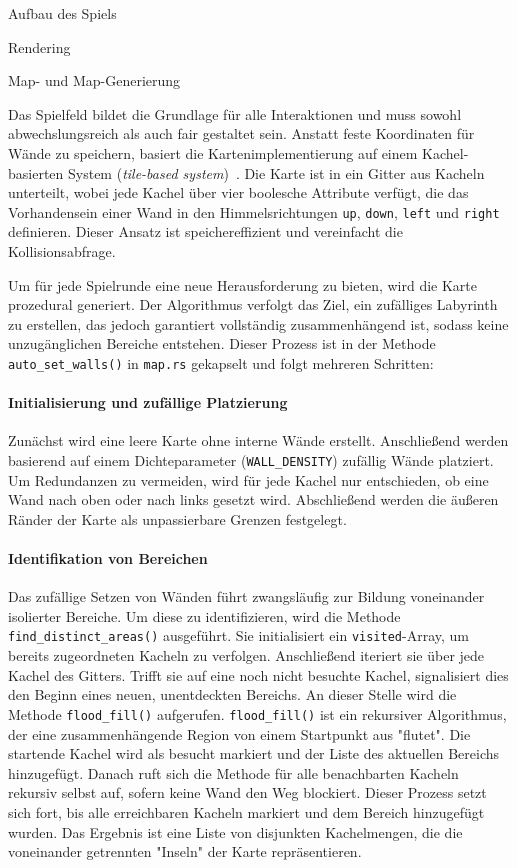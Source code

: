 \begin{section}{Aufbau des Spiels}
\begin{subsection}{Rendering}
\end{subsection}

\begin{subsection}{Map- und Map-Generierung}

Das Spielfeld bildet die Grundlage für alle Interaktionen und muss sowohl abwechslungsreich als auch fair gestaltet sein.
Anstatt feste Koordinaten für Wände zu speichern, basiert die Kartenimplementierung auf einem Kachel-basierten System (\textit{tile-based system})~\cite{mdn_tilemaps}.
Die Karte ist in ein Gitter aus Kacheln unterteilt, wobei jede Kachel über vier boolesche Attribute verfügt, die das Vorhandensein einer Wand in den Himmelsrichtungen \texttt{up}, \texttt{down}, \texttt{left} und \texttt{right} definieren.
Dieser Ansatz ist speichereffizient und vereinfacht die Kollisionsabfrage.

Um für jede Spielrunde eine neue Herausforderung zu bieten, wird die Karte prozedural generiert.
Der Algorithmus verfolgt das Ziel, ein zufälliges Labyrinth zu erstellen, das jedoch garantiert vollständig zusammenhängend ist, sodass keine unzugänglichen Bereiche entstehen.
Dieser Prozess ist in der Methode \texttt{auto\_set\_walls()} in \texttt{map.rs} gekapselt und folgt mehreren Schritten:

\paragraph{Initialisierung und zufällige Platzierung}
Zunächst wird eine leere Karte ohne interne Wände erstellt.
Anschließend werden basierend auf einem Dichteparameter (\texttt{WALL\_DENSITY}) zufällig Wände platziert.
Um Redundanzen zu vermeiden, wird für jede Kachel nur entschieden, ob eine Wand nach oben oder nach links gesetzt wird.
Abschließend werden die äußeren Ränder der Karte als unpassierbare Grenzen festgelegt.
\paragraph{Identifikation von Bereichen}
Das zufällige Setzen von Wänden führt zwangsläufig zur Bildung voneinander isolierter Bereiche.
Um diese zu identifizieren, wird die Methode \texttt{find\_distinct\_areas()} ausgeführt.
Sie initialisiert ein \texttt{visited}-Array, um bereits zugeordneten Kacheln zu verfolgen.
Anschließend iteriert sie über jede Kachel des Gitters.
Trifft sie auf eine noch nicht besuchte Kachel, signalisiert dies den Beginn eines neuen, unentdeckten Bereichs.
An dieser Stelle wird die Methode \texttt{flood\_fill()} aufgerufen.
\texttt{flood\_fill()} ist ein rekursiver Algorithmus, der eine zusammenhängende Region von einem Startpunkt aus "flutet".
Die startende Kachel wird als besucht markiert und der Liste des aktuellen Bereichs hinzugefügt.
Danach ruft sich die Methode für alle benachbarten Kacheln rekursiv selbst auf, sofern keine Wand den Weg blockiert.
Dieser Prozess setzt sich fort, bis alle erreichbaren Kacheln markiert und dem Bereich hinzugefügt wurden.
Das Ergebnis ist eine Liste von disjunkten Kachelmengen, die die voneinander getrennten "Inseln" der Karte repräsentieren.

\end{subsection}
\end{section}
